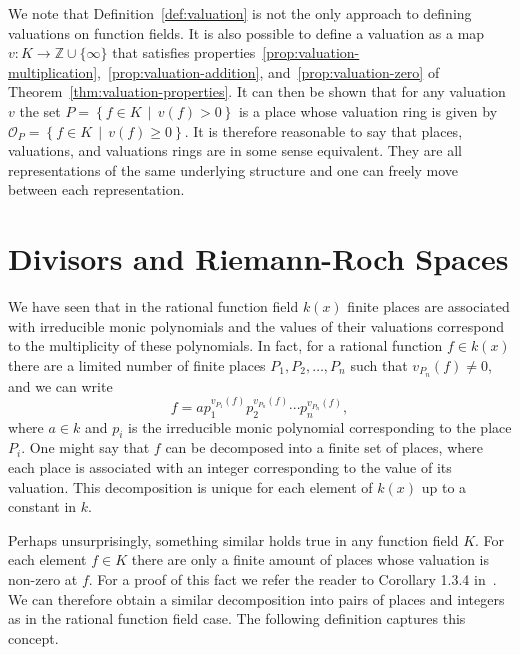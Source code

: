 We note that Definition~\ref{def:valuation} is not the only approach to defining valuations on function fields. It is also possible to define a valuation as a map \(v: K \to \mathbb{Z} \cup \{\infty\}\) that satisfies properties~\ref{prop:valuation-multiplication},~\ref{prop:valuation-addition}, and~\ref{prop:valuation-zero} of Theorem~\ref{thm:valuation-properties}. It can then be shown that for any valuation \(v\) the set \(P = \left\{ f \in K \,\middle|\, v(f) > 0 \right\}\) is a place whose valuation ring is given by \(\mathcal{O}_{P} = \left\{ f \in K \,\middle|\, v(f) \geq 0 \right\}\). It is therefore reasonable to say that places, valuations, and valuations rings are in some sense equivalent. They are all representations of the same underlying structure and one can freely move between each representation.

\section{Divisors and Riemann-Roch Spaces}%
\label{sec:divisors-and-riemann-roch-spaces}

We have seen that in the rational function field \(k(x)\) finite places are associated with irreducible monic polynomials and the values of their valuations correspond to the multiplicity of these polynomials. In fact, for a rational function \(f \in k(x)\) there are a limited number of finite places \(P_{1}, P_{2}, \dots, P_{n}\) such that \(v_{P_{n}}(f) \neq 0\), and we can write
\[f = a p_{1}^{v_{P_{1}}(f)} p_{2}^{v_{P_{n}}(f)} \cdots p_{n}^{v_{P_{n}}(f)},\]
where \(a \in k\) and \(p_{i}\) is the irreducible monic polynomial corresponding to the place \(P_{i}\). One might say that \(f\) can be decomposed into a finite set of places, where each place is associated with an integer corresponding to the value of its valuation. This decomposition is unique for each element of \(k(x)\) up to a constant in \(k\).

Perhaps unsurprisingly, something similar holds true in any function field \(K\). For each element \(f \in K\) there are only a finite amount of places whose valuation is non-zero at \(f\). For a proof of this fact we refer the reader to Corollary 1.3.4 in~\cite{stichtenoth-2009-algebraic-function-fields}. We can therefore obtain a similar decomposition into pairs of places and integers as in the rational function field case. The following definition captures this concept.

